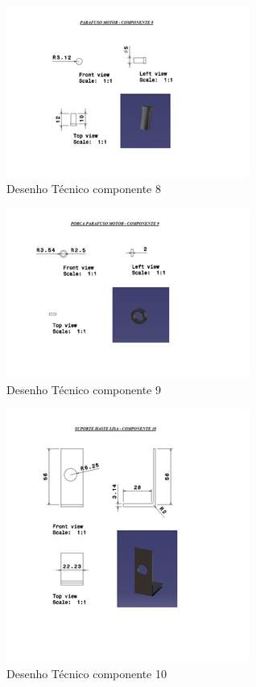 \begin{apendicesenv}
\begin{figure}[H]
		\centering
			\includegraphics[scale=1.0]{figuras/tec8.png}
		\caption{Desenho Técnico componente 8}
		\label{tec8}
\end{figure}

\begin{figure}[H]
		\centering
			\includegraphics[scale=1.0]{figuras/tec9.png}
		\caption{Desenho Técnico componente 9}
		\label{tec9}
\end{figure}

\begin{figure}[H]
		\centering
			\includegraphics[scale=1.0]{figuras/tec10.png}
		\caption{Desenho Técnico componente 10}
		\label{tec10}
\end{figure}


\end{apendicesenv}
